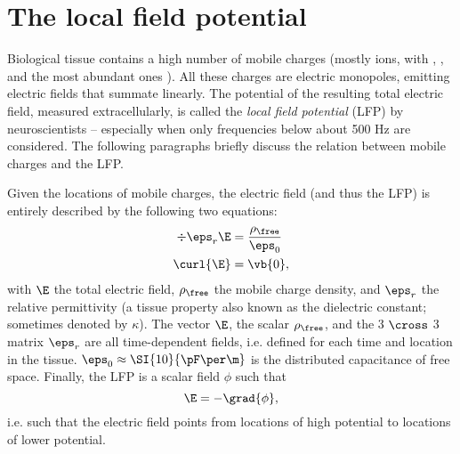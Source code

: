 \section{The local field potential}
\label{sec:LFP}

Biological tissue contains a high number of mobile charges (mostly ions, with , , and  the most abundant ones \cite{Martinsen2015a}). All these charges are electric monopoles, emitting electric fields that summate linearly. The potential of the resulting total electric field, measured extracellularly, is called the \emph{local field potential} (LFP) by neuroscientists -- especially when only frequencies below about 500 Hz are considered. The following paragraphs briefly discuss the relation between mobile charges and the LFP.

Given the locations of mobile charges, the electric field (and thus the LFP) is entirely described by the following two equations:\footnotemark{}
%
\begin{align}
\div{\eps_r \E}  &= \frac{\rho_\free}{\eps_0}   \label{eq:gauss} \\
\curl{\E}        &= \vb{0},                     \label{eq:irrot}
\end{align}
%
with $\E$ the total electric field, $\rho_\free$ the mobile charge density, and $\eps_r$ the relative permittivity (a tissue property also known as the dielectric constant; sometimes denoted by $\kappa$). The vector $\E$, the scalar $\rho_\free$, and the 3 $\cross$ 3 matrix $\eps_r$ are all time-dependent fields, i.e. defined for each time and location in the tissue. $\eps_0 \approx \SI{10}{\pF\per\m}$ is the distributed capacitance of free space. Finally, the LFP is a scalar field $\phi$ such that
%
\begin{equation}
\label{eq:potential}
\E = -\grad{\phi},
\end{equation}
%
i.e. such that the electric field points from locations of high potential to locations of lower potential.


